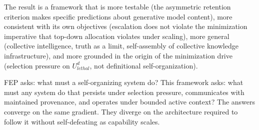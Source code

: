 \documentclass[
]{article}
\begin{document}
The result is a framework that is more testable (the asymmetric
retention criterion makes specific predictions about generative model
content), more consistent with its own objectives (escalation does not
violate the minimization imperative that top-down allocation violates
under scaling), more general (collective intelligence, truth as a limit,
self-assembly of collective knowledge infrastructure), and more grounded
in the origin of the minimization drive (selection pressure on
\(U_{lethal}^d\), not definitional self-organization).

FEP asks: what must a self-organizing system do? This framework asks:
what must any system do that persists under selection pressure,
communicates with maintained provenance, and operates under bounded
active context? The answers converge on the same gradient. They diverge
on the architecture required to follow it without self-defeating as
capability scales.



\end{document}
